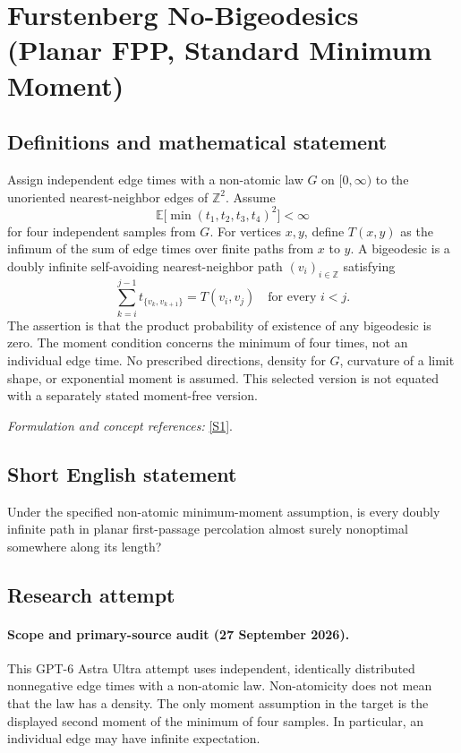 \documentclass[11pt]{article}
\begin{document}
\section*{\texorpdfstring{Furstenberg No-Bigeodesics (Planar FPP, Standard Minimum Moment)}{Furstenberg No-Bigeodesics (Planar FPP, Standard Minimum Moment)}}\label{statement}
\subsection{Definitions and mathematical statement}
Assign independent edge times with a non-atomic law $G$ on $[0,\infty)$ to the unoriented nearest-neighbor edges of ${\mathbb{Z}}^2$. Assume
\[
 {\mathbb{E}}\bigl[\min(t_1,t_2,t_3,t_4)^2\bigr]<\infty
\]
for four independent samples from $G$. For vertices $x,y$, define $T(x,y)$ as the infimum of the sum of edge times over finite paths from $x$ to $y$. A bigeodesic is a doubly infinite self-avoiding nearest-neighbor path $(v_i)_{i\in{\mathbb{Z}}}$ satisfying
\[
 \sum_{k=i}^{j-1}t_{\{v_k,v_{k+1}\}}=T(v_i,v_j)
 \quad\text{for every }i<j.
\]
The assertion is that the product probability of existence of any bigeodesic is zero. The moment condition concerns the minimum of four times, not an individual edge time. No prescribed directions, density for $G$, curvature of a limit shape, or exponential moment is assumed. This selected version is not equated with a separately stated moment-free version.
\par\smallskip\textit{Formulation and concept references:} \href{https://arxiv.org/pdf/1512.00804}{[S1]}.

\subsection{Short English statement}
Under the specified non-atomic minimum-moment assumption, is every doubly infinite path in planar first-passage percolation almost surely nonoptimal somewhere along its length?
\subsection{Research attempt}

\paragraph{Scope and primary-source audit (27 September 2026).}
This GPT-6 Astra Ultra attempt uses independent, identically distributed
nonnegative edge times with a non-atomic law. Non-atomicity does not mean
that the law has a density. The only moment assumption in the target is
the displayed second moment of the minimum of four samples. In particular,
an individual edge may have infinite expectation.
\end{document}
